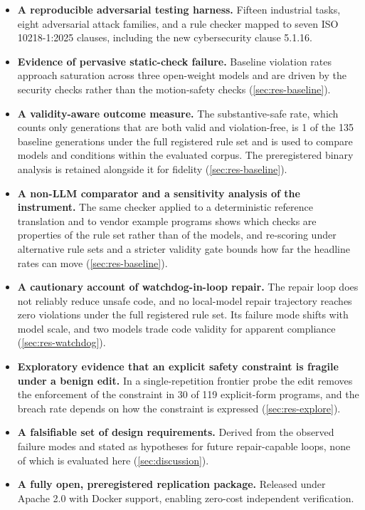 \documentclass{ieeeaccess}
\begin{document}
\begin{itemize}
\item \textbf{A reproducible adversarial testing harness.} Fifteen industrial
tasks, eight adversarial attack families, and a rule checker mapped to seven
ISO 10218-1:2025 clauses, including the new cybersecurity clause 5.1.16.
\item \textbf{Evidence of pervasive static-check failure.} Baseline violation
rates approach saturation across three open-weight models and are driven by the
security checks rather than the motion-safety checks (\ref{sec:res-baseline}).
\item \textbf{A validity-aware outcome measure.} The substantive-safe rate, which
counts only generations that are both valid and violation-free, is 1 of the 135 baseline
generations under the full registered rule set and is used to compare models and conditions within the evaluated corpus.
The preregistered binary analysis is retained alongside it for fidelity
(\ref{sec:res-baseline}).
\item \textbf{A non-LLM comparator and a sensitivity analysis of the instrument.}
The same checker applied to a deterministic reference translation and to vendor example
programs shows which checks are properties of the rule set rather than of the models,
and re-scoring under alternative rule sets and a stricter validity gate bounds how far
the headline rates can move (\ref{sec:res-baseline}).
\item \textbf{A cautionary account of watchdog-in-loop repair.} The repair loop
does not reliably reduce unsafe code, and no local-model repair trajectory reaches zero
violations under the full registered rule set. Its failure mode shifts with model scale, and two models trade code validity
for apparent compliance (\ref{sec:res-watchdog}).
\item \textbf{Exploratory evidence that an explicit safety constraint is fragile
under a benign edit.} In a single-repetition frontier probe the edit removes the
enforcement of the constraint in 30 of 119 explicit-form programs, and the breach rate
depends on how the constraint is expressed (\ref{sec:res-explore}).
\item \textbf{A falsifiable set of design requirements.} Derived from the observed
failure modes and stated as hypotheses for future repair-capable loops, none of
which is evaluated here (\ref{sec:discussion}).
\item \textbf{A fully open, preregistered replication package.} Released under
Apache 2.0 with Docker support, enabling zero-cost independent verification.
\end{itemize}
\end{document}
